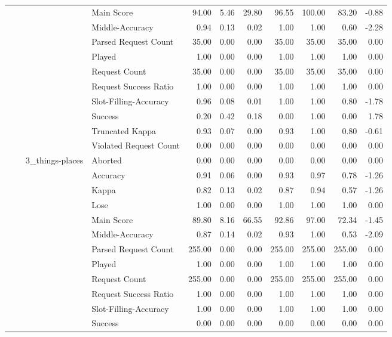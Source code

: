 \begin{tabular}{llllrrrrrrr}
 &  &  & Main Score & 94.00 & 5.46 & 29.80 & 96.55 & 100.00 & 83.20 & -0.88 \\
 &  &  & Middle-Accuracy & 0.94 & 0.13 & 0.02 & 1.00 & 1.00 & 0.60 & -2.28 \\
 &  &  & Parsed Request Count & 35.00 & 0.00 & 0.00 & 35.00 & 35.00 & 35.00 & 0.00 \\
 &  &  & Played & 1.00 & 0.00 & 0.00 & 1.00 & 1.00 & 1.00 & 0.00 \\
 &  &  & Request Count & 35.00 & 0.00 & 0.00 & 35.00 & 35.00 & 35.00 & 0.00 \\
 &  &  & Request Success Ratio & 1.00 & 0.00 & 0.00 & 1.00 & 1.00 & 1.00 & 0.00 \\
 &  &  & Slot-Filling-Accuracy & 0.96 & 0.08 & 0.01 & 1.00 & 1.00 & 0.80 & -1.78 \\
 &  &  & Success & 0.20 & 0.42 & 0.18 & 0.00 & 1.00 & 0.00 & 1.78 \\
 &  &  & Truncated Kappa & 0.93 & 0.07 & 0.00 & 0.93 & 1.00 & 0.80 & -0.61 \\
 &  &  & Violated Request Count & 0.00 & 0.00 & 0.00 & 0.00 & 0.00 & 0.00 & 0.00 \\
\cline{3-11}
 &  & \multirow[t]{14}{*}{3_things-places} & Aborted & 0.00 & 0.00 & 0.00 & 0.00 & 0.00 & 0.00 & 0.00 \\
 &  &  & Accuracy & 0.91 & 0.06 & 0.00 & 0.93 & 0.97 & 0.78 & -1.26 \\
 &  &  & Kappa & 0.82 & 0.13 & 0.02 & 0.87 & 0.94 & 0.57 & -1.26 \\
 &  &  & Lose & 1.00 & 0.00 & 0.00 & 1.00 & 1.00 & 1.00 & 0.00 \\
 &  &  & Main Score & 89.80 & 8.16 & 66.55 & 92.86 & 97.00 & 72.34 & -1.45 \\
 &  &  & Middle-Accuracy & 0.87 & 0.14 & 0.02 & 0.93 & 1.00 & 0.53 & -2.09 \\
 &  &  & Parsed Request Count & 255.00 & 0.00 & 0.00 & 255.00 & 255.00 & 255.00 & 0.00 \\
 &  &  & Played & 1.00 & 0.00 & 0.00 & 1.00 & 1.00 & 1.00 & 0.00 \\
 &  &  & Request Count & 255.00 & 0.00 & 0.00 & 255.00 & 255.00 & 255.00 & 0.00 \\
 &  &  & Request Success Ratio & 1.00 & 0.00 & 0.00 & 1.00 & 1.00 & 1.00 & 0.00 \\
 &  &  & Slot-Filling-Accuracy & 1.00 & 0.00 & 0.00 & 1.00 & 1.00 & 1.00 & 0.00 \\
 &  &  & Success & 0.00 & 0.00 & 0.00 & 0.00 & 0.00 & 0.00 & 0.00 \\

\end{tabular}
